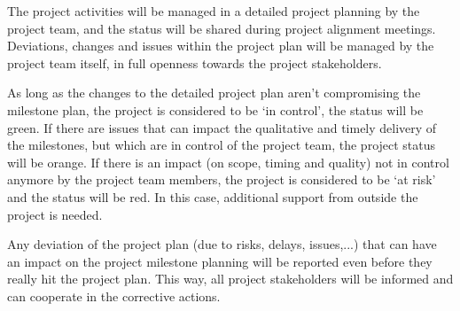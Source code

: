 \noindent
The project activities will be managed in a detailed project planning by the project team, and the status will be shared during project alignment meetings.
Deviations, changes and issues within the project plan will be managed by the project team itself, in full openness towards the project stakeholders.

As long as the changes to the detailed project plan aren't  compromising the milestone plan, the project is considered to be `in control', the status will be green.
If there are issues that can impact the qualitative and timely delivery of the milestones, but which are in control of the project team, the project status will be orange.
If there is an impact (on scope, timing and quality) not in control anymore by the project team members, the project is considered to be `at risk' and the status will be red.
In this case, additional support from outside the project is needed.

Any deviation of the project plan (due to risks, delays, issues,...) that can have an impact on the project milestone planning will be reported even before they really hit the project plan.
This way, all project stakeholders will be informed and can cooperate in the corrective actions.




